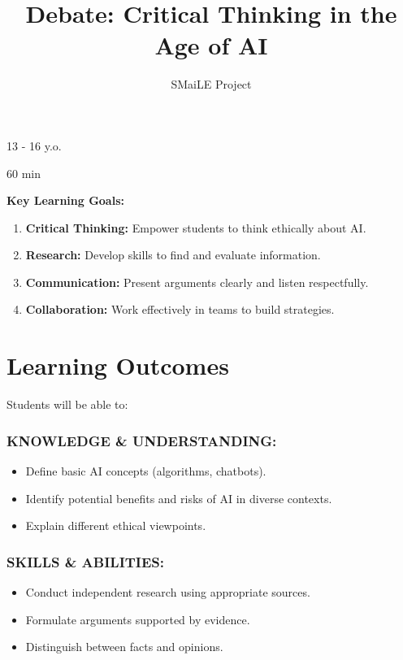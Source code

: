 \documentclass[11pt, a4paper]{article}
\begin{document}
\title{\textbf{\color{SmailePurple}Debate: Critical Thinking in the Age of AI}}
\author{SMaiLE Project}
\date{}
\maketitle
\thispagestyle{plain}

\begin{keyinfobox}
    \begin{description}[leftmargin=*, labelindent=0pt]
        \item[\bfseries\color{SmailePurple} Target Group:] 13 - 16 y.o.
        \item[\bfseries\color{SmailePurple} Duration:] 60 min
    \end{description}
    \textbf{Key Learning Goals:}
    \begin{enumerate}
        \item \textbf{Critical Thinking:} Empower students to think ethically about AI.
        \item \textbf{Research:} Develop skills to find and evaluate information.
        \item \textbf{Communication:} Present arguments clearly and listen respectfully.
        \item \textbf{Collaboration:} Work effectively in teams to build strategies.
    \end{enumerate}
\end{keyinfobox}

\section*{Learning Outcomes}
Students will be able to:

\subsubsection*{KNOWLEDGE \& UNDERSTANDING:}
\begin{itemize}
    \item Define basic AI concepts (algorithms, chatbots).
    \item Identify potential benefits and risks of AI in diverse contexts.
    \item Explain different ethical viewpoints.
\end{itemize}

\subsubsection*{SKILLS \& ABILITIES:}
\begin{itemize}
    \item Conduct independent research using appropriate sources.
    \item Formulate arguments supported by evidence.
    \item Distinguish between facts and opinions.
\end{itemize}
\end{document}
